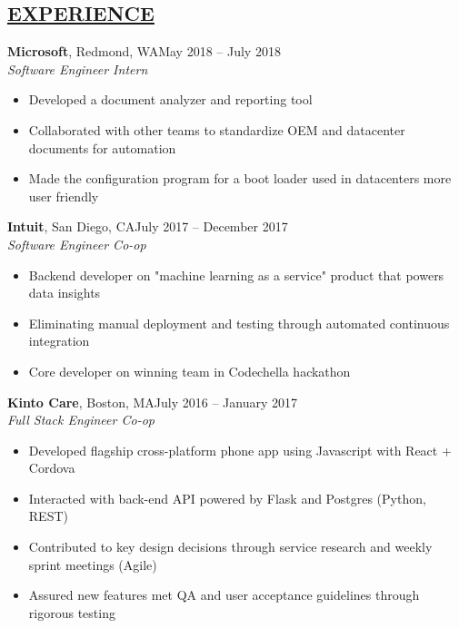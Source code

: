 \documentclass[overlapped,line]{res}
\begin{document}
\begin{resume}
\noindent\makebox[7.15in]{\rule{7.15in}{0.4pt}}

\section{\underline{EXPERIENCE}}

\textbf{Microsoft}, Redmond, WA\hfill May 2018 \--- July 2018\\
{\sl Software Engineer Intern}
\begin{itemize} \itemsep -2pt
\item Developed a document analyzer and reporting tool
\item Collaborated with other teams to standardize OEM and datacenter documents for automation
\item Made the configuration program for a boot loader used in datacenters more user friendly
\end{itemize}

\textbf{Intuit}, San Diego, CA\hfill July 2017 \--- December 2017\\
{\sl Software Engineer Co-op}
\begin{itemize} \itemsep -2pt
\item Backend developer on "machine learning as a service" product that powers data insights
\item Eliminating manual deployment and testing through automated continuous integration
\item Core developer on winning team in Codechella hackathon
\end{itemize}

\textbf{Kinto Care}, Boston, MA\hfill July 2016 \--- January 2017\\
{\sl Full Stack Engineer Co-op}
\begin{itemize} \itemsep -2pt
\item Developed flagship cross-platform phone app using Javascript with React + Cordova
\item Interacted with back-end API powered by Flask and Postgres (Python, REST)
\item Contributed to key design decisions through service research and weekly sprint meetings (Agile)
\item Assured new features met QA and user acceptance guidelines through rigorous testing
\end{itemize}



\end{resume}
\end{document}
